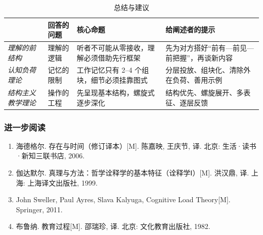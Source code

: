 \begin{table}[htbp]
    \centering
    \caption{总结与建议}
    \label{tab:three-perspectives-explanation}
    \begin{tabularx}{\textwidth}{l l >{\raggedright\arraybackslash}X >{\raggedright\arraybackslash}X}
        \toprule
        & \textbf{回答的问题} & \textbf{核心命题} & \textbf{给阐述者的提示} \\
        \midrule
        \textit{理解的前结构} & 理解的逻辑 & 听者不可能从零接收，理解必须借助先行框架 & 先为对方搭好“前有—前见—前把握”，再谈新内容 \\
        \textit{认知负荷理论} & 记忆的限制 & 工作记忆只有 2--4 个组块，细节必须挂靠图式 & 分层投放、组块化、清除外在负荷、善用示例 \\
        \textit{结构主义教学理论} & 操作的工程 & 先呈现基本结构，螺旋式逐步深化 & 结构优先、螺旋展开、多表征、逐层反馈 \\
        \bottomrule
    \end{tabularx}
\end{table}

\subsubsection{进一步阅读}

\begin{enumerate}
    \item 海德格尔. 存在与时间（修订译本）[M]. 陈嘉映, 王庆节, 译. 北京: 生活·读书·新知三联书店, 2006.
    \item 伽达默尔. 真理与方法：哲学诠释学的基本特征（诠释学Ⅰ）[M]. 洪汉鼎, 译. 上海: 上海译文出版社, 1999.
    \item John Sweller, Paul Ayres, Slava Kalyuga, Cognitive Load Theory[M]. Springer, 2011.
    \item 布鲁纳. 教育过程[M]. 邵瑞珍, 译. 北京: 文化教育出版社, 1982.
\end{enumerate}

